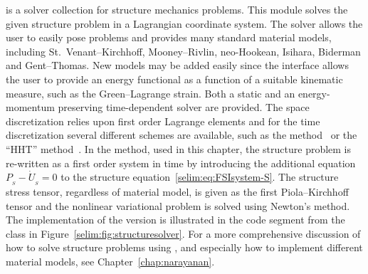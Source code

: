  is a solver collection for structure mechanics
problems. This module solves the given structure problem in a
Lagrangian coordinate system.  The solver allows the user to easily
pose problems and provides many standard material models, including
St.~Venant--Kirchhoff, Mooney--Rivlin, neo-Hookean, Isihara, Biderman
and Gent--Thomas. New models may be added easily since the interface
allows the user to provide an energy functional as a function of a
suitable kinematic measure, such as the Green--Lagrange strain. Both a
static and an energy-momentum preserving time-dependent solver are
provided. The space discretization relies upon first order Lagrange
elements and for the time discretization several different schemes are
available, such as the \cgone{}
method~\citep{ErikssonEstepHansboEtAl1996} or the ``HHT''
method~\citep{HilberHughesTaylor1977}.  In the \cgone{} method, used in
this chapter, the structure problem is re-written as a first order
system in time by introducing the additional equation $P_{_{S}} -
\dot{U}_{_{S}} = 0$ to the structure equation~\eqref{selim:eq:FSIsystem-S}. The structure stress tensor, regardless
of material model, is given as the first Piola--Kirchhoff tensor and
the nonlinear variational problem is solved using Newton's method.
The implementation of the \cgone{} version is illustrated in the code
segment from the class  in
Figure~\ref{selim:fig:structuresolver}. For a more comprehensive
discussion of how to solve structure problems using ,
and especially how to implement different material models, see
Chapter~\ref{chap:narayanan}.

